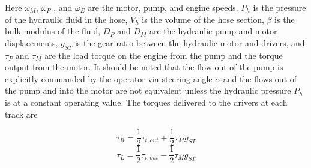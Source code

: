 Here $\omega_M$, $\omega_P$ , and $\omega_E$ are the motor, pump, and engine speeds. $P_h$ is the pressure of the hydraulic fluid in the hose, $V_h$ is the volume of the hose section, $\beta$ is the bulk modulus of the fluid, $D_P$ and $D_M$ are the hydraulic pump and motor displacements, $g_{ST}$ is the gear ratio between the hydraulic motor and drivers, and $\tau_P$ and $\tau_M$ are the load torque on the engine from the pump and the torque output from the motor. It should be noted that the flow out of the pump is explicitly commanded by the operator via steering angle $\alpha$ and the flows out of the pump and into the motor are not equivalent unless the hydraulic pressure $P_h$ is at a constant operating value. The torques delivered to the drivers at each track are 
\begin{linenomath*}
    \begin{equation}
        \tau_R = \frac{1}{2}\tau_{t,out} + \frac{1}{2}\tau_Mg_{ST}
    \end{equation}
    \begin{equation}
        \tau_L = \frac{1}{2}\tau_{t,out} - \frac{1}{2}\tau_Mg_{ST}
    \end{equation}
\end{linenomath*}
\vspace{-10pt}